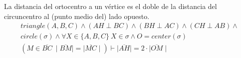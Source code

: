 \begin{theorem} \label{th_51M04_h2v_2x_o2m}
	La distancia del ortocentro a un vértice es el doble de la distancia del circuncentro al (punto medio del) lado opuesto.
	\begin{equation}
	\begin{gathered}
		triangle(A,B,C) \land (AH \perp BC) \land (BH \perp AC) \land (CH \perp AB) \land \\
		circle(\sigma) \land \forall X \in \{A,B,C\}\ X \in \sigma \land O = center(\sigma) \\
		(M \in \overline{BC}\ \mid\overline{BM}\mid = \mid\overline{MC}\mid) \vdash \mid\overline{AH}\mid = 2 \cdot \mid\overline{OM}\mid
	\end{gathered}
	\end{equation}
\end{theorem}